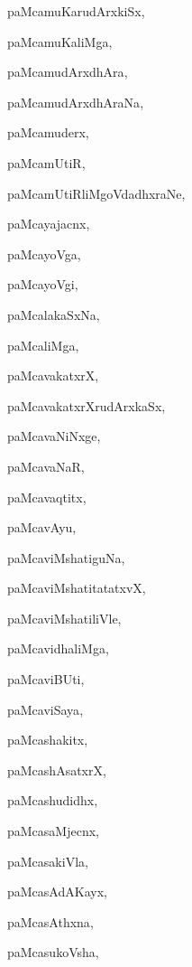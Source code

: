 \begin{multicols}{2}
{paMcamuKarudArxkiSx}, \pageref{paMcamuKarudArxkiSx}

{paMcamuKaliMga}, \pageref{paMcamuKaliMga}

{paMcamudArxdhAra}, \pageref{paMcamudArxdhAra}

{paMcamudArxdhAraNa}, \pageref{paMcamudArxdhAraNa}

{paMcamuderx}, \pageref{paMcamuderx}

{paMcamUtiR}, \pageref{paMcamUtiR}

{paMcamUtiRliMgoVdadhxraNe}, \pageref{paMcamUtiRliMgoVdadhxraNe}

{paMcayajacnx}, \pageref{paMcayajacnx}

{paMcayoVga}, \pageref{paMcayoVga}

{paMcayoVgi}, \pageref{paMcayoVgi}

{paMcalakaSxNa}, \pageref{paMcalakaSxNa}

{paMcaliMga}, \pageref{paMcaliMga}

{paMcavakatxrX}, \pageref{paMcavakatxrX}

{paMcavakatxrXrudArxkaSx}, \pageref{paMcavakatxrXrudArxkaSx}

{paMcavaNiNxge}, \pageref{paMcavaNiNxge}

{paMcavaNaR}, \pageref{paMcavaNaR}

{paMcavaqtitx}, \pageref{paMcavaqtitx}

{paMcavAyu}, \pageref{paMcavAyu}

{paMcaviMshatiguNa}, \pageref{paMcaviMshatiguNa}

{paMcaviMshatitatatxvX}, \pageref{paMcaviMshatitatatxvX}

{paMcaviMshatiliVle}, \pageref{paMcaviMshatiliVle}

{paMcavidhaliMga}, \pageref{paMcavidhaliMga}

{paMcaviBUti}, \pageref{paMcaviBUti}

{paMcaviSaya}, \pageref{paMcaviSaya}

{paMcashakitx}, \pageref{paMcashakitx}

{paMcashAsatxrX}, \pageref{paMcashAsatxrX}

{paMcashudidhx}, \pageref{paMcashudidhx}

{paMcasaMjecnx}, \pageref{paMcasaMjecnx}

{paMcasakiVla}, \pageref{paMcasakiVla}

{paMcasAdAKayx}, \pageref{paMcasAdAKayx}

{paMcasAthxna}, \pageref{paMcasAthxna}

{paMcasukoVsha}, \pageref{paMcasukoVsha}


\end{multicols}
